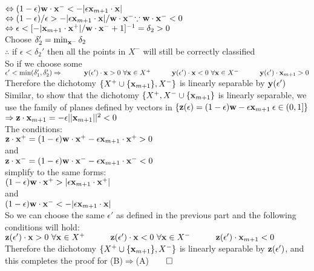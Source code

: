 \documentclass[11pt, oneside]{amsart}   	%
\begin{document}
\indent$\Leftrightarrow (1-\epsilon)\bold{w}\cdot\bold{x}^-<-|\epsilon\bold{x}_{m+1}\cdot\bold{x}|$\\
\indent$\Leftrightarrow (1-\epsilon)/\epsilon>-|\epsilon\bold{x}_{m+1}\cdot\bold{x}|/\bold{w}\cdot\bold{x}^-$\hfill$\because \bold{w}\cdot\bold{x}^-<0$\\
\indent$\Leftrightarrow\epsilon< [-|\bold{x}_{m+1}\cdot\bold{x}^+|/\bold{w}\cdot\bold{x}^-+1]^{-1}=\delta_2>0$\\
\indent Choose $\delta_2'=\min_{\bold{x}^-}\delta_2$\\
\indent$\therefore$ if $\epsilon<\delta_2'$ then all the points in $X^-$ will still be correctly classified\\
So if we choose some $\epsilon'<\min(\delta_1',\delta_2')\Rightarrow \\
\indent\indent\bold{y}(\epsilon')\cdot\bold{x}>0\ \forall\bold{x}\in X^+\\
\indent\indent\bold{y}(\epsilon')\cdot\bold{x}<0\ \forall\bold{x}\in X^-\\
\indent\indent\bold{y}(\epsilon')\cdot\bold{x}_{m+1}>0
$\\
Therefore the dichotomy $\{X^+\cup \{\bold{x}_{m+1}\}, X^-\}$ is linearly separable by $\bold{y}(\epsilon')$\\

Similar, to show that the dichotomy $\{X^+,X^-\cup\{\bold{x}_{m+1}\}$ is linearly separable, we use the family of planes defined by vectors in $\{\bold{z}(\epsilon)=(1-\epsilon)\bold{w}-\epsilon\bold{x}_{m+1}\:\epsilon\in (0,1]\}$\\
\indent$\Rightarrow\bold{z}\cdot\bold{x}_{m+1}=-\epsilon||\bold{x}_{m+1}||^2<0$\\
The conditions:\\
\indent$\bold{z}\cdot\bold{x}^+=(1-\epsilon)\bold{w}\cdot\bold{x}^+-\epsilon\bold{x}_{m+1}\cdot\bold{x}^+>0$\\
\indent and\\
\indent$\bold{z}\cdot\bold{x}^-=(1-\epsilon)\bold{w}\cdot\bold{x}^--\epsilon\bold{x}_{m+1}\cdot\bold{x}^-<0$\\
simplify to the same forms:\\
\indent$(1-\epsilon)\bold{w}\cdot\bold{x}^+>|\epsilon\bold{x}_{m+1}\cdot\bold{x}^+|$\\
\indent and \\
\indent$(1-\epsilon)\bold{w}\cdot\bold{x}^-<-|\epsilon\bold{x}_{m+1}\cdot\bold{x}|$\\
So we can choose the same $\epsilon'$ as defined in the previous part and the following conditions will hold:\\
\indent\indent$\bold{z}(\epsilon')\cdot\bold{x}>0\ \forall\bold{x}\in X^+\\
\indent\indent\bold{z}(\epsilon')\cdot\bold{x}<0\ \forall\bold{x}\in X^-\\
\indent\indent\bold{z}(\epsilon')\cdot\bold{x}_{m+1}<0\\$
Therefore the dichotomy $\{X^+\cup \{\bold{x}_{m+1}\}, X^-\}$ is linearly separable by $\bold{z}(\epsilon')$, and this completes the proof for (B)$\Rightarrow$(A)$\qed$\\
\end{document}

